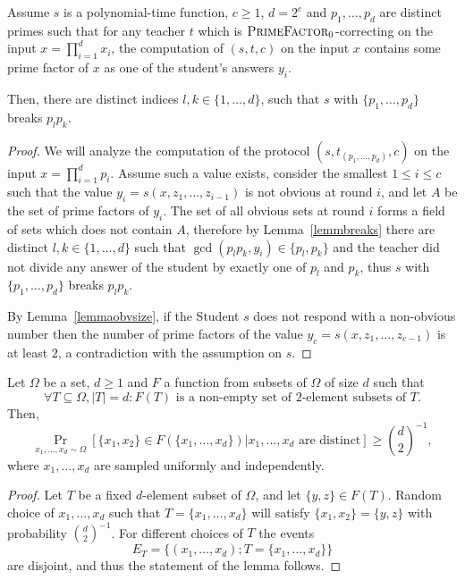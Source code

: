 \documentclass{lmcs}
\newcommand{\abs}[1]{\lvert #1\rvert}
\newcommand{\PrimeFactor}{\textsc{PrimeFactor}}
\begin{document}
\begin{lem}\label{lemmabreak}
    Assume $s$ is a polynomial-time function, $c\geq 1$, $d=2^c$ and $p_1,\dots,p_d$ are distinct primes such that for any teacher $t$ which is $\PrimeFactor_0$-correcting on the input $x=\prod_{i=1}^d x_i$, the computation of $(s,t,c)$ on the input $x$ contains some prime factor of $x$ as one of the student's answers $y_i$.
    
    Then, there are distinct indices $l,k\in \{1,\dots,d\}$, such that $s$ with $\{p_1,\dots,p_d\}$ breaks $p_lp_k$. 
\end{lem}
\begin{proof}
    We will analyze the computation of the protocol $(s,t_{(p_1,\dots,p_{d})},c)$ on the input $x=\prod_{i=1}^{d}p_i$. Assume such a value exists, consider the smallest $1\leq i\leq c$ such that the value $y_i = s(x,z_1,\dots,z_{i-1})$ is not obvious at round $i$, and let $A$ be the set of prime factors of $y_i$. The set of all obvious sets at round $i$ forms a field of sets which does not contain $A$, therefore by Lemma~\ref{lemmbreaks} there are distinct $l,k \in \{1,\dots,d\}$ such that $\gcd(p_lp_k, y_i)\in\{p_l,p_k\}$ and the teacher did not divide any answer of the student by exactly one of $p_l$ and $p_k$, thus $s$ with $\{p_1,\dots,p_d\}$ breaks $p_lp_k$. 
    
    By Lemma~\ref{lemmaobvsize}, if the Student $s$ does not respond with a non-obvious number then the number of prime factors of the value $y_c = s(x,z_1,\dots,z_{c-1})$ is at least $2$, a contradiction with the assumption on $s$.
\end{proof}

\begin{lem}\label{lemmprob}
    Let $\Omega$ be a set, $d\geq 1$ and $F$ a function from subsets of $\Omega$ of size $d$ such that
    \[\forall T\subseteq \Omega, \abs{T}=d: F(T)\text{ is a non-empty set of $2$-element subsets of $T$.} \]
    Then,
    \[\Pr_{x_1,\dots,x_d \sim \Omega}[\{x_1,x_2\} \in F(\{x_1,\dots,x_d\})|x_1,\dots,x_d \text{ are distinct}]\geq \binom{d}{2}^{-1},\]
    where $x_1,\dots,x_d$ are sampled uniformly and independently.
\end{lem}
\begin{proof}
    Let $T$ be a fixed $d$-element subset of $\Omega$, and let $\{y,z\}\in F(T)$. Random choice of $x_1,\dots,x_d$ such that $T=\{x_1,\dots,x_d\}$ will satisfy $\{x_1,x_2\}=\{y,z\}$ with probability $\binom{d}{2}^{-1}$. For different choices of $T$ the events \[E_T=\{(x_1,\dots,x_d) ; T=\{x_1,\dots,x_d\}\}\] are disjoint, and thus the statement of the lemma follows.
\end{proof}
\end{document}
